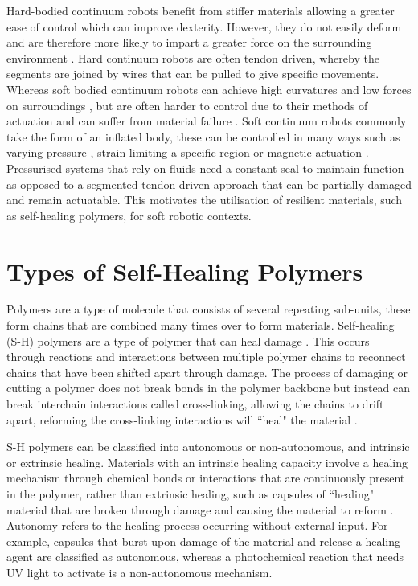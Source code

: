 Hard-bodied continuum robots benefit from stiffer materials allowing a greater ease of control \cite{russo2023continuum} which can improve dexterity. However, they do not easily deform and are therefore more likely to impart a greater force on the surrounding environment \cite{davy2024vine}.  Hard continuum robots are often tendon driven, whereby the segments are joined by wires that can be pulled to give specific movements. Whereas soft bodied continuum robots can achieve high curvatures and low forces on surroundings \cite{rus2015design}, but are often harder to control due to their methods of actuation \cite{russo2023continuum} and can suffer from material failure \cite{abidi2017intrinsic}. Soft continuum robots commonly take the form of an inflated body, these can be controlled in many ways such as varying pressure \cite{hawkes2017soft}, strain limiting a specific region \cite{guo2024encoded, dean2025anisotropic} or magnetic actuation \cite{davy2025magnetic, davy2024vine}. Pressurised systems that rely on fluids need a constant seal to maintain function as opposed to a segmented tendon driven approach that can be partially damaged and remain actuatable. This motivates the utilisation of resilient materials, such as self-healing polymers, for soft robotic contexts.



\section{Types of Self-Healing Polymers}


Polymers are a type of molecule that consists of several repeating sub-units, these form chains that are combined many times over to form materials. Self-healing (S-H) polymers are a type of polymer that can heal damage \cite{srivastav2025comprehensive}. This occurs through reactions and interactions between multiple polymer chains to reconnect chains that have been shifted apart through damage. The process of damaging or cutting a polymer does not break bonds in the polymer backbone but instead can break interchain interactions called cross-linking, allowing the chains to drift apart, reforming the cross-linking interactions will ``heal" the material \cite{binder2013self}. 

S-H polymers can be classified into autonomous or non-autonomous, and intrinsic or extrinsic healing\cite{terryn2021review}. Materials with an intrinsic healing capacity involve a healing mechanism through chemical bonds or interactions that are continuously present in the polymer, rather than extrinsic healing, such as capsules of ``healing" material that are broken through damage and causing the material to reform \cite{white2001autonomic}. Autonomy refers to the healing process occurring without external input. For example, capsules that burst upon damage of the material and release a healing agent are classified as autonomous, whereas a photochemical reaction that needs UV light to activate \cite{trenor2004coumarins,froimowicz2011photoreactive} is a non-autonomous mechanism. 


